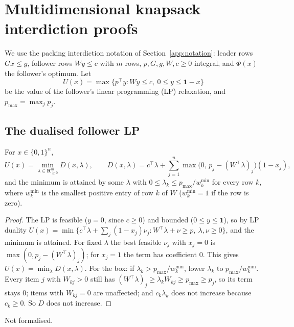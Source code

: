 \section{Multidimensional knapsack interdiction proofs}\label{app:mkip}

We use the packing interdiction notation of Section~\ref{app:notation}: leader
rows $Gx\le g$, follower rows $Wy\le c$ with $m$ rows, $p,G,g,W,c\ge 0$ integral,
and $\Phi(x)$ the follower's optimum. Let
\[
  U(x)=\max\bigl\{p^{\top}y : Wy\le c,\ 0\le y\le\mathbf{1}-x\bigr\}
\]
be the value of the follower's linear programming (LP) relaxation, and
$p_{\max}=\max_jp_j$.

\subsection{The dualised follower LP}

\begin{lemma}\label{lem:mkip-dual}
For $x\in\{0,1\}^n$,
\[
  U(x)=\min_{\lambda\in\mathbf{R}^m_{\ge 0}}D(x,\lambda),\qquad
  D(x,\lambda)=c^{\top}\lambda+\sum_{j=1}^n\max\bigl(0,\,p_j-(W^{\top}\lambda)_j\bigr)(1-x_j),
\]
and the minimum is attained by some $\lambda$ with $0\le\lambda_k\le p_{\max}/w^{\min}_k$
for every row $k$, where $w^{\min}_k$ is the smallest positive entry of row $k$
of $W$ ($w^{\min}_k=1$ if the row is zero).
\end{lemma}
\begin{proof}
The LP is feasible ($y=0$, since $c\ge 0$) and bounded ($0\le y\le\mathbf{1}$), so by
LP duality $U(x)=\min\{c^{\top}\lambda+\sum_j(1-x_j)\nu_j : W^{\top}\lambda+\nu\ge p,\ \lambda,\nu\ge 0\}$,
and the minimum is attained. For fixed $\lambda$ the best feasible $\nu_j$ with
$x_j=0$ is $\max(0,p_j-(W^{\top}\lambda)_j)$; for $x_j=1$ the term has coefficient
$0$. This gives $U(x)=\min_\lambda D(x,\lambda)$. For the box: if
$\lambda_k>p_{\max}/w^{\min}_k$, lower $\lambda_k$ to $p_{\max}/w^{\min}_k$. Every
item $j$ with $W_{kj}>0$ still has $(W^{\top}\lambda)_j\ge\lambda_kW_{kj}\ge p_{\max}\ge p_j$,
so its term stays $0$; items with $W_{kj}=0$ are unaffected; and $c_k\lambda_k$
does not increase because $c_k\ge 0$. So $D$ does not increase.
\end{proof}
\noindent Not formalised.

